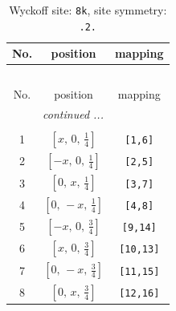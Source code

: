 \documentclass[fleqn,8pt]{jsarticle}
\begin{document}
\begin{longtable}{ccc}
\caption{Wyckoff site: {\tt 8k}, site symmetry: {\tt .2.}}
 \\
 \hline \hline
No. & position & mapping \\ \hline \endfirsthead

\multicolumn{2}{l}{\tablename\ \thetable{}} \\
 \hline \hline
No. & position & mapping \\ \hline \endhead

 \hline \hline
\multicolumn{2}{r}{\footnotesize\it continued ...} \\ \endfoot

 \hline \hline
\multicolumn{2}{r}{} \\ \endlastfoot

1 & $\left[ x,\, 0,\, \frac{1}{4} \right]$ & {\tt [1,6]} \\ \hline
2 & $\left[ - x,\, 0,\, \frac{1}{4} \right]$ & {\tt [2,5]} \\ \hline
3 & $\left[ 0,\, x,\, \frac{1}{4} \right]$ & {\tt [3,7]} \\ \hline
4 & $\left[ 0,\, - x,\, \frac{1}{4} \right]$ & {\tt [4,8]} \\ \hline
5 & $\left[ - x,\, 0,\, \frac{3}{4} \right]$ & {\tt [9,14]} \\ \hline
6 & $\left[ x,\, 0,\, \frac{3}{4} \right]$ & {\tt [10,13]} \\ \hline
7 & $\left[ 0,\, - x,\, \frac{3}{4} \right]$ & {\tt [11,15]} \\ \hline
8 & $\left[ 0,\, x,\, \frac{3}{4} \right]$ & {\tt [12,16]} \\
\end{longtable}
\renewcommand{\arraystretch}{1.2}
\end{document}
